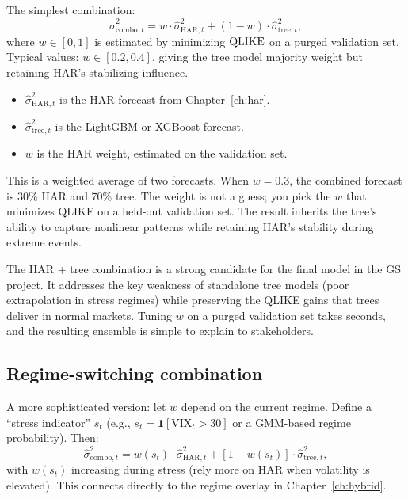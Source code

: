 The simplest combination:
\begin{equation}\label{eq:trees:combo}
  \hat{\sigma}^2_{\text{combo},t}
  = w \cdot \hat{\sigma}^2_{\text{HAR},t}
  + (1-w) \cdot \hat{\sigma}^2_{\text{tree},t},
\end{equation}
where $w \in [0,1]$ is estimated by minimizing $\operatorname{QLIKE}$ on a purged
validation set.  Typical values: $w \in [0.2, 0.4]$, giving the tree model
majority weight but retaining HAR's stabilizing influence.

\begin{itemize}[leftmargin=1.8em]
  \item $\hat{\sigma}^2_{\text{HAR},t}$ is the HAR forecast from
        Chapter~\ref{ch:har}.
  \item $\hat{\sigma}^2_{\text{tree},t}$ is the LightGBM or XGBoost
        forecast.
  \item $w$ is the HAR weight, estimated on the validation set.
\end{itemize}

\begin{intuition}
This is a weighted average of two forecasts.  When $w = 0.3$, the combined
forecast is 30\% HAR and 70\% tree.  The weight is not a guess; you pick the
$w$ that minimizes QLIKE on a held-out validation set.  The result inherits
the tree's ability to capture nonlinear patterns while retaining HAR's
stability during extreme events.
\end{intuition}

\begin{projectconnection}
The HAR + tree combination is a strong candidate for the final model in the
GS project.  It addresses the key weakness of standalone tree models
(poor extrapolation in stress regimes) while preserving the QLIKE gains
that trees deliver in normal markets.  Tuning $w$ on a purged validation
set takes seconds, and the resulting ensemble is simple to explain to
stakeholders.
\end{projectconnection}

\subsection*{Regime-switching combination}

A more sophisticated version: let $w$ depend on the current regime.  Define
a ``stress indicator'' $s_t$ (e.g., $s_t = \mathbf{1}[\text{VIX}_t > 30]$ or
a GMM-based regime probability).  Then:
\begin{equation}\label{eq:trees:regime_combo}
  \hat{\sigma}^2_{\text{combo},t}
  = w(s_t) \cdot \hat{\sigma}^2_{\text{HAR},t}
  + [1 - w(s_t)] \cdot \hat{\sigma}^2_{\text{tree},t},
\end{equation}
with $w(s_t)$ increasing during stress (rely more on HAR when volatility is
elevated).  This connects directly to the regime overlay in
Chapter~\ref{ch:hybrid}.

